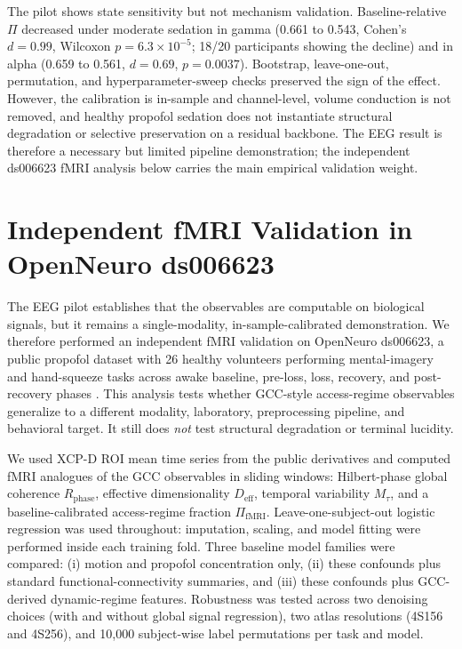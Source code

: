 \documentclass[11pt,a4paper]{article}
\theoremstyle{plain}
\theoremstyle{definition}
\theoremstyle{remark}
\begin{document}
The pilot shows state sensitivity but not mechanism validation. Baseline-relative $\Pi$ decreased under moderate sedation in gamma (0.661 to 0.543, Cohen's $d=0.99$, Wilcoxon $p=6.3\times10^{-5}$; 18/20 participants showing the decline) and in alpha (0.659 to 0.561, $d=0.69$, $p=0.0037$). Bootstrap, leave-one-out, permutation, and hyperparameter-sweep checks preserved the sign of the effect. However, the calibration is in-sample and channel-level, volume conduction is not removed, and healthy propofol sedation does not instantiate structural degradation or selective preservation on a residual backbone. The EEG result is therefore a necessary but limited pipeline demonstration; the independent ds006623 fMRI analysis below carries the main empirical validation weight.


\section{Independent fMRI Validation in OpenNeuro ds006623}
\label{sec:fmri-validation}

The EEG pilot establishes that the observables are computable on biological signals, but it remains a single-modality, in-sample-calibrated demonstration. We therefore performed an independent fMRI validation on OpenNeuro ds006623, a public propofol dataset with 26 healthy volunteers performing mental-imagery and hand-squeeze tasks across awake baseline, pre-loss, loss, recovery, and post-recovery phases \citep{huang2026,huangopenneuro2025}. This analysis tests whether GCC-style access-regime observables generalize to a different modality, laboratory, preprocessing pipeline, and behavioral target. It still does \emph{not} test structural degradation or terminal lucidity.

We used XCP-D ROI mean time series from the public derivatives and computed fMRI analogues of the GCC observables in sliding windows: Hilbert-phase global coherence $R_{\mathrm{phase}}$, effective dimensionality $D_{\mathrm{eff}}$, temporal variability $M_\tau$, and a baseline-calibrated access-regime fraction $\Pi_{\mathrm{fMRI}}$. Leave-one-subject-out logistic regression was used throughout: imputation, scaling, and model fitting were performed inside each training fold. Three baseline model families were compared: (i) motion and propofol concentration only, (ii) these confounds plus standard functional-connectivity summaries, and (iii) these confounds plus GCC-derived dynamic-regime features. Robustness was tested across two denoising choices (with and without global signal regression), two atlas resolutions (4S156 and 4S256), and 10,000 subject-wise label permutations per task and model.
\end{document}
